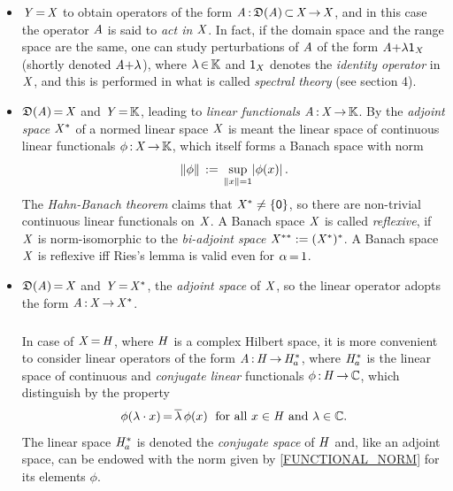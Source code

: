 \documentclass[11pt,twoside]{article}
\begin{document}
\begin{itemize}[leftmargin=4mm]
\item[1.]
$\mathit{Y} {\,=\,} \mathit{X}$ to obtain operators of the form
$\mathit{A} {\,:\,} \mathfrak{D}(\mathit{A}) {\,\subset\,} \mathit{X} {\,\to\,} \mathit{X}$,
and in this case the operator $\mathit{A}$ is said to \textit{act in} $\mathit{X}$.
In fact,
if the domain space and the range space are the same,
one can study perturbations of $\mathit{A}$
of the form $\mathit{A} {+} \lambda {\mathsf{1}}_{\mathit{X}}$
(shortly denoted $\mathit{A} {+} \lambda$),
where $\lambda {\,\in\,} {\mathbb{K}}$
and ${\mathsf{1}}_{\mathit{X}}$ denotes the \textit{identity operator} in $\mathit{X}$,
and this is performed in what is called \textit{spectral theory}
(see section 4).

\item[2.] %
$\mathfrak{D}(\mathit{A}) {\,=\,} \mathit{X}$ and $\mathit{Y} {\,=\,} {\mathbb{K}}$,
leading to \textit{linear functionals} $\mathit{A} {\,:\,} \mathit{X} {\,\to\,} {\mathbb{K}}$.
By the \textit{adjoint space} $\mathit{X}^*$ of a normed linear space $\mathit{X}$
is meant the linear space of continuous linear functionals
$\phi {\,:\,} \mathit{X} {\,\to\,} {\mathbb{K}}$,
which itself forms a Banach space with norm
\begin{equation}\label{FUNCTIONAL_NORM}
\norm{\phi} \eqdef \sup_{\norm{x}=1} \abs{\phi(x)} \,.
\end{equation}
The \textit{Hahn-Banach theorem} claims
that $\mathit{X}^* \neq \{{\mathsf{0}}\}$,
so there are non-trivial continuous linear functionals on $\mathit{X}$.
A Banach space $\mathit{X}$ is called \textit{reflexive},
if $\mathit{X}$ is norm-isomorphic to the \textit{bi-adjoint space}
$\mathit{X}^{**} := (\mathit{X}^*)^*$.
A Banach space $\mathit{X}$ is reflexive iff {Ries's lemma} is valid
even for $\alpha {\,=\,} 1$.

\item[3.] %
$\mathfrak{D}(\mathit{A}) {\,=\,} \mathit{X}$ and $\mathit{Y} {\,=\,} \mathit{X}^*$,
the \textit{adjoint space} of $\mathit{X}$,
so the linear operator adopts the form $\mathit{A} {\,:\,} \mathit{X} {\,\to\,} \mathit{X}^*$.

\subparagraph{}
In case of $\mathit{X} {\,=\,} \mathit{H}$, where $\mathit{H}$ is a complex Hilbert space,
it is more convenient to consider linear operators of the form
$\mathit{A} {\,:\,} \mathit{H} {\,\to\,} \mathit{H}_a^*$,
where $\mathit{H}_a^*$ is the linear space of continuous and
\textit{conjugate linear} functionals $\phi {\,:\,} \mathit{H} {\,\to\,} {\mathbb{C}}$,
which distinguish by the property
\[
\phi(\lambda \cdot x) {\,=\,} \overline{\lambda} \, \phi(x)
\; \mbox{ for all } x \in \mathit{H} \mbox{ and } \lambda \in {\mathbb{C}}.
\]
The linear space $\mathit{H}_a^*$ is denoted the \textit{conjugate space} of $\mathit{H}$ and,
like an adjoint space,
can be endowed with the norm given by \eqref{FUNCTIONAL_NORM} for its elements $\phi$.


\end{itemize}
\end{document}
